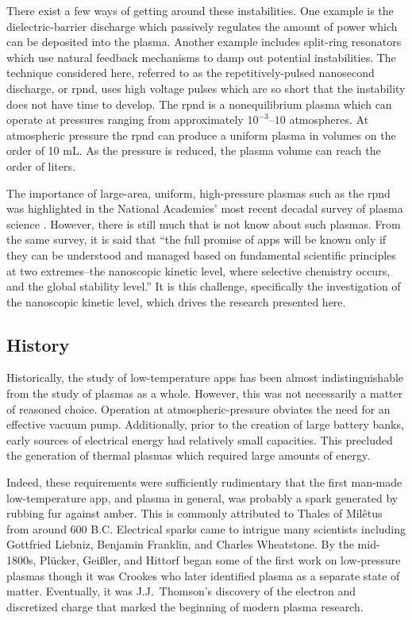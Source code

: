 There exist a few ways of getting around these instabilities. One example is the
dielectric-barrier discharge which passively regulates the amount of power which
can be deposited into the plasma. Another example includes split-ring resonators
which use natural feedback mechanisms to damp out potential instabilities. The
technique considered here, referred to as the repetitively-pulsed nanosecond
discharge, or \acs{rpnd}, uses high voltage pulses which are so short that the
instability does not have time to develop. The \acs{rpnd} is a nonequilibrium
plasma which can operate at pressures ranging from approximately $10^{-3}$--$10$
atmospheres. At atmospheric pressure the \acs{rpnd} can produce a uniform plasma
in volumes on the order of 10 mL. As the pressure is reduced, the plasma volume
can reach the order of liters.

The importance of large-area, uniform, high-pressure plasmas such as the
\acs{rpnd} was highlighted in the National Academies' most recent decadal survey
of plasma science \cite{NA2007}. However, there is still much that is not know
about such plasmas. From the same survey, it is said that ``the full promise of
\acs{app}s will be known only if they can be understood and managed based on
fundamental scientific principles at two extremes--the nanoscopic kinetic level,
where selective chemistry occurs, and the global stability level.'' It is this
challenge, specifically the investigation of the nanoscopic kinetic level, which
drives the research presented here.

\subsection{History}

Historically, the study of low-temperature \acs{app}s has been almost
indistinguishable from the study of plasmas as a whole. However, this was not
necessarily a matter of reasoned choice. Operation at atmospheric-pressure
obviates the need for an effective vacuum pump. Additionally, prior to the
creation of large battery banks, early sources of electrical energy had
relatively small capacities. This precluded the generation of thermal plasmas
which required large amounts of energy.

Indeed, these requirements were sufficiently rudimentary that the first man-made
low-temperature \acs{app}, and plasma in general, was probably a spark generated
by rubbing fur against amber. This is commonly attributed to Thales of
Mil\^{e}tus from around 600 B.C. Electrical sparks came to intrigue many
scientists including Gottfried Liebniz, Benjamin Franklin, and Charles
Wheatstone. By the mid-1800s, Pl\"{u}cker, Gei\ss{}ler, and Hittorf began some
of the first work on low-pressure plasmas though it was Crookes who later
identified plasma as a separate state of matter. Eventually, it was J.J.\
Thomson's discovery of the electron and discretized charge that marked the
beginning of modern plasma research.

